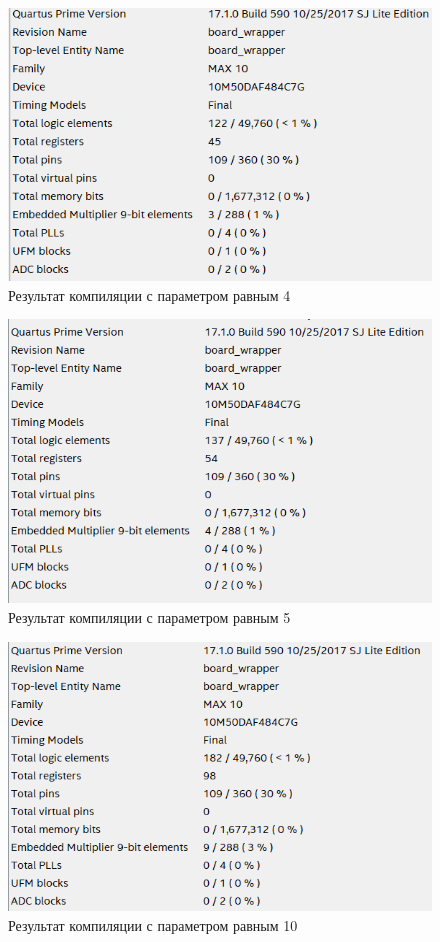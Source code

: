 \documentclass[a4paper,14pt]{article}
\begin{document}
	\begin{figure}[H]
		\centering
		\includegraphics[width=0.8\linewidth]{images/z3_4}
		\caption{Результат компиляции с параметром равным 4}
		\label{fig:z34}
	\end{figure}

	\begin{figure}[H]
		\centering
		\includegraphics[width=0.8\linewidth]{images/z3_5}
		\caption{Результат компиляции с параметром равным 5}
		\label{fig:z35}
	\end{figure}

	\begin{figure}[H]
		\centering
		\includegraphics[width=0.8\linewidth]{images/z3_10}
		\caption{Результат компиляции с параметром равным 10}
		\label{fig:z310}
	\end{figure}
	
\end{document}
